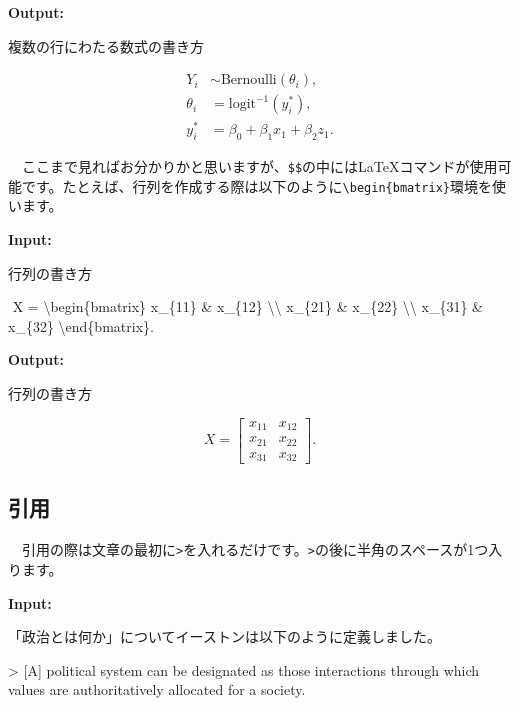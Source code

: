 \documentclass[
  a4paper,
  pandoc,
  ja=standard,
  jafont=haranoaji]{bxjsbook}
\newenvironment{Shaded}{\begin{snugshade}}{\end{snugshade}}
\newcommand{\AttributeTok}[1]{\textcolor[rgb]{0.00,0.48,0.65}{#1}}
\newcommand{\CommentTok}[1]{\textcolor[rgb]{0.37,0.37,0.37}{#1}}
\newcommand{\NormalTok}[1]{\textcolor[rgb]{0.00,0.48,0.65}{#1}}
\newcommand{\OtherTok}[1]{\textcolor[rgb]{0.00,0.48,0.65}{#1}}
\newcommand{\SpecialCharTok}[1]{\textcolor[rgb]{0.37,0.37,0.37}{#1}}
\begin{document}
\textbf{Output:}

複数の行にわたる数式の書き方

\[
\begin{aligned}
  Y_i      & \sim \text{Bernoulli}(\theta_i), \\
  \theta_i & = \text{logit}^{-1}(y_i^*), \\
  y_i^*    & = \beta_0 + \beta_1 x_1 + \beta_2 z_1.
\end{aligned}
\]

　ここまで見ればお分かりかと思いますが、\texttt{\$\$}の中にはLaTeXコマンドが使用可能です。たとえば、行列を作成する際は以下のように\texttt{\textbackslash{}begin\{bmatrix\}}環境を使います。

\textbf{Input:}

\begin{Shaded}
\begin{Highlighting}[]
\NormalTok{行列の書き方}

\NormalTok{$$}
\NormalTok{X = \textbackslash{}begin\{bmatrix\}}
\NormalTok{  x\_\{11\} \& x\_\{12\} }\SpecialCharTok{\textbackslash{}\textbackslash{}}
\NormalTok{  x\_\{21\} \& x\_\{22\} }\SpecialCharTok{\textbackslash{}\textbackslash{}}
\NormalTok{  x\_\{31\} \& x\_\{32\}}
\NormalTok{\textbackslash{}end\{bmatrix\}.}
\NormalTok{$$}
\end{Highlighting}
\end{Shaded}

\textbf{Output:}

行列の書き方

\[
X = \begin{bmatrix}
  x_{11} & x_{12} \\
  x_{21} & x_{22} \\
  x_{31} & x_{32}
\end{bmatrix}.
\]

\hypertarget{ux5f15ux7528}{%
\subsection{引用}\label{ux5f15ux7528}}

　引用の際は文章の最初に\texttt{\textgreater{}}を入れるだけです。\texttt{\textgreater{}}の後に半角のスペースが1つ入ります。

\textbf{Input:}

\begin{Shaded}
\begin{Highlighting}[]
\NormalTok{「政治とは何か」についてイーストンは以下のように定義しました。}

\AttributeTok{\textgreater{} }\CommentTok{[}\OtherTok{A}\CommentTok{]}\AttributeTok{ political system can be designated as those interactions through which values are authoritatively allocated for a society.}
\end{Highlighting}
\end{Shaded}
\end{document}

